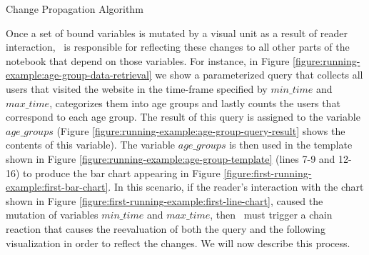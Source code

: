 \begin{algorithm}[t!]
\caption{Change Propagation Algorithm}
\label{algo:change-propagation-algorithm2}
\end{algorithm} 


Once a set of bound variables is mutated by a visual unit as a result of reader interaction, \projname\ is responsible for reflecting these changes to all other parts of the notebook that depend on those variables. For instance, in Figure \ref{figure:running-example:age-group-data-retrieval} we show a parameterized query that collects all users that visited the website in the time-frame specified by $min\_time$ and $max\_time$, categorizes them into age groups and lastly counts the users that correspond to each age group. The result of this query is assigned to the variable $age\_groups$ (Figure \ref{figure:running-example:age-group-query-result} shows the contents of this variable). The variable $age\_groups$ is then used in the template shown in Figure \ref{figure:running-example:age-group-template} (lines 7-9 and 12-16) to produce the bar chart appearing in Figure \ref{figure:first-running-example:first-bar-chart}. In this scenario, if the reader's interaction with the chart shown in Figure \ref{figure:first-running-example:first-line-chart}, caused the mutation of variables $min\_time$ and $max\_time$, then \projname\ must trigger a chain reaction that causes the reevaluation of both the query and the following visualization in order to reflect the changes. We will now describe this process.



